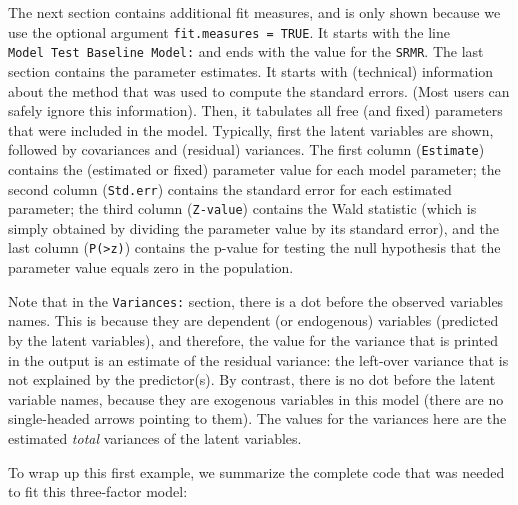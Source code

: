 The next section contains additional fit measures, and is only shown
because we use the optional argument \texttt{fit.measures\ =\ TRUE}. It
starts with the line \texttt{Model\ Test\ Baseline\ Model:} and ends
with the value for the \texttt{SRMR}. The last section contains the
parameter estimates. It starts with (technical) information about the
method that was used to compute the standard errors. (Most users can
safely ignore this information). Then, it tabulates all free (and fixed)
parameters that were included in the model. Typically, first the latent
variables are shown, followed by covariances and (residual) variances.
The first column (\texttt{Estimate}) contains the (estimated or fixed)
parameter value for each model parameter; the second column
(\texttt{Std.err}) contains the standard error for each estimated
parameter; the third column (\texttt{Z-value}) contains the Wald
statistic (which is simply obtained by dividing the parameter value by
its standard error), and the last column
(\texttt{P(\textgreater{}\textbar{}z\textbar{})}) contains the p-value
for testing the null hypothesis that the parameter value equals zero in
the population.

Note that in the \texttt{Variances:} section, there is a dot before the
observed variables names. This is because they are dependent (or
endogenous) variables (predicted by the latent variables), and
therefore, the value for the variance that is printed in the output is
an estimate of the residual variance: the left-over variance that is not
explained by the predictor(s). By contrast, there is no dot before the
latent variable names, because they are exogenous variables in this
model (there are no single-headed arrows pointing to them). The values
for the variances here are the estimated \emph{total} variances of the
latent variables.

To wrap up this first example, we summarize the complete code that was
needed to fit this three-factor model:

\begin{Shaded}
\begin{Highlighting}[]

\OtherTok{\textless{}{-}} 

\OtherTok{\textless{}{-}} 

 \NormalTok{)}
\end{Highlighting}
\end{Shaded}

